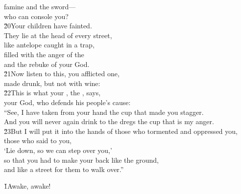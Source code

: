 \begin{poetry}
\poemll    famine and the sword--- \\
\poemlll       who can console you? \\
\poeml \v{20}Your children have fainted. \\
\poemll    They lie at the head of every street, \\
\poemlll       like antelope caught in a trap, \\
\poeml filled with the anger of the  \\
\poemll    and the rebuke of your God. \\
\poeml \v{21}Now listen to this, you afflicted one, \\
\poemll    made drunk, but not with wine: \\
\poeml \v{22}This is what your , the , says, \\
\poemll    your God, who defends his people's cause: \\
\poeml ``See, I have taken from your hand the cup that made you stagger. \\
\poemll    And you will never again drink to the dregs the cup that is my anger. \\
\poeml \v{23}But I will put it into the hands of those who tormented and oppressed you, \\
\poemll    those who said to you, \\
\poeml `Lie down, so we can step over you,' \\
\poemll    so that you had to make your back like the ground, \\
\poemlll       and like a street for them to walk over.''
\end{poetry}

\v{1}Awake, awake!


